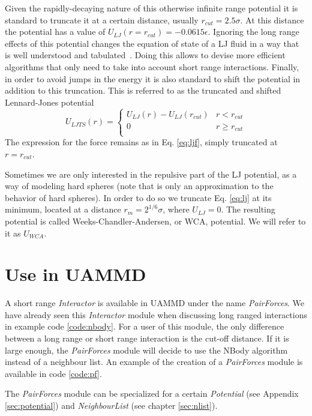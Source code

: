 \documentclass[twoside,openright,titlepage,numbers=noenddot,%
headinclude,footinclude,cleardoublepage=empty,abstract=on,
BCOR=5mm,fontsize=11pt, dvipsnames, paper=b5
]{scrreprt}
\newcommand{\uammd}{\gls{UAMMD}\xspace}
\begin{document}
Given the rapidly-decaying nature of this otherwise infinite range potential it is standard to truncate it at a certain distance, usually $r_{cut} = 2.5\sigma$. At this distance the potential has a value of $U_{LJ}(r = r_{cut}) = -0.0615\epsilon$.
Ignoring the long range effects of this potential changes the equation of state of a \gls{LJ} fluid in a way that is well understood and tabulated~\cite{Thol2015}. Doing this allows to devise more efficient algorithms that only need to take into account short range interactions.
Finally, in order to avoid jumps in the energy it is also standard to shift the potential in addition to this truncation. This is referred to as the truncated and shifted Lennard-Jones potential
\begin{equation}
  \label{eq:ljts}
  U_{LJTS}(r) =
  \begin{cases}
      U_{LJ}(r) - U_{LJ}(r_{cut}) & r<r_{cut}\\
      0 & r\ge r_{cut}\\                                    
    \end{cases}
\end{equation}
The expression for the force remains as in Eq. \eqref{eq:ljf}, simply truncated at $r=r_{cut}$.

Sometimes we are only interested in the repulsive part of the LJ potential, as a way of modeling hard spheres (note that is only an approximation to the behavior of hard spheres). In order to do so we truncate Eq. \eqref{eq:lj} at its minimum, located at a distance $r_m = 2^{1/6}\sigma$, where $U_{LJ} = 0$. The resulting potential is called Weeks-Chandler-Andersen, or WCA, potential. We will refer to it as $U_{WCA}$.

\section*{Use in UAMMD}

A short range \emph{Interactor} is available in \uammd under the name \emph{PairForces}. We have already seen this \emph{Interactor} module when discussing long ranged interactions in example code \ref{code:nbody}. For a user of this module, the only difference between a long range or short range interaction is the cut-off distance. If it is large enough, the \emph{PairForces} module will decide to use the NBody algorithm instead of a neighbour list. An example of the creation of a \emph{PairForces} module is available in code \ref{code:pf}.

The \emph{PairForces} module can be specialized for a certain \emph{Potential} (see Appendix \ref{sec:potential}) and \emph{NeighbourList} (see chapter \ref{sec:nlist}).
\end{document}
